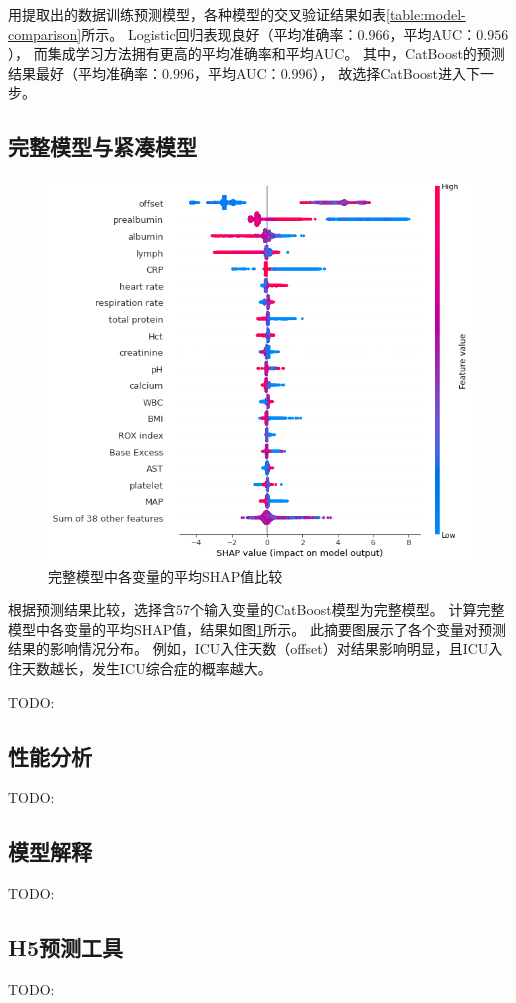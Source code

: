 用提取出的数据训练预测模型，各种模型的交叉验证结果如表\ref{table:model-comparison}所示。%
Logistic回归表现良好（平均准确率：$0.966$，平均AUC：$0.956$），%
而集成学习方法拥有更高的平均准确率和平均AUC。%
其中，CatBoost的预测结果最好（平均准确率：$0.996$，平均AUC：$0.996$），%
故选择CatBoost进入下一步。

\subsection{完整模型与紧凑模型}

\begin{figure}[htbp]
    \centering
    \includegraphics[width=0.9\linewidth]{../img/eicu_full_shap_beeswarm_20.png}
    \caption{完整模型中各变量的平均SHAP值比较}
    \label{figure:full-shap}
\end{figure}

根据预测结果比较，选择含$57$个输入变量的CatBoost模型为完整模型。%
计算完整模型中各变量的平均SHAP值，结果如图\ref{figure:full-shap}所示。%
此摘要图展示了各个变量对预测结果的影响情况分布。%
例如，ICU入住天数（offset）对结果影响明显，且ICU入住天数越长，发生ICU综合症的概率越大。

TODO:

\subsection{性能分析}

TODO:

\subsection{模型解释}

TODO:

\subsection{H5预测工具}

TODO:
